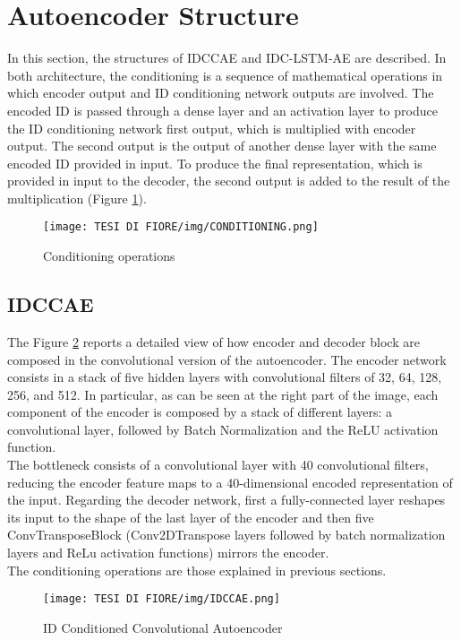 \section{Autoencoder Structure}
In this section, the structures of IDCCAE and IDC-LSTM-AE are described. In both architecture, the conditioning is a sequence of mathematical operations in which encoder output and ID conditioning network outputs are involved. The encoded ID is passed through a dense layer and an activation layer to produce the ID conditioning network first output, which is multiplied with encoder output. The second output is the output of another dense layer with the same encoded ID provided in input. To produce the final representation, which is provided in input to the decoder, the second output is added to the result of the multiplication (Figure \ref{conditioning}).

\begin{figure}[ht]
\texttt{[image: TESI DI FIORE/img/CONDITIONING.png]}
\centering
\caption{Conditioning operations}
\label{conditioning}
\end{figure}

\subsection{IDCCAE}
The Figure \ref{IDCCAE} reports a detailed view of how encoder and decoder block are composed in the convolutional version of the autoencoder. The encoder network consists in a stack of five hidden layers with convolutional filters of 32, 64, 128, 256, and 512. In particular, as can be seen at the right part of the image, each component of the encoder is composed by a stack of different layers: a convolutional layer, followed by Batch Normalization and the ReLU activation function. \\The bottleneck consists of a convolutional layer with 40 convolutional filters, reducing the encoder feature maps to a 40-dimensional encoded representation of the input. Regarding the decoder network, first a fully-connected layer reshapes its input to the shape of the last layer of the encoder and then five ConvTransposeBlock (Conv2DTranspose layers followed by batch normalization layers and ReLu activation functions) mirrors the encoder.\\
The conditioning operations are those explained in previous sections.

\begin{figure}[ht]
\texttt{[image: TESI DI FIORE/img/IDCCAE.png]}
\centering
\caption{ID Conditioned Convolutional Autoencoder}
\label{IDCCAE}
\end{figure}

